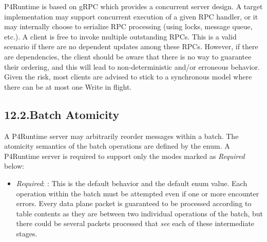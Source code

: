 \documentclass[11pt]{article}
\begin{document}
{%
P4Runtime is based on gRPC which provides a concurrent server design. A target
implementation may support concurrent execution of a given RPC handler, or it
may internally choose to serialize RPC processing (using locks, message queue,
etc.). A client is free to invoke multiple outstanding  RPCs. This is a
valid scenario if there are no dependent updates among these RPCs. However, if
there are dependencies, the client should be aware that there is no way to
guarantee their ordering, and this will lead to non-deterministic and/or
erroneous behavior. Given the risk, most clients are advised to stick to a
synchronous model where there can be at most one Write  in flight.%

\subsection{12.2.\hspace*{0.5em}Batch Atomicity}\label{sec-batch-atomicity}%

\noindent{}A P4Runtime server may arbitrarily reorder messages within a batch. The
atomicity semantics of the batch operations are defined by the 
enum. A P4Runtime server is required to support only the modes marked as
\emph{Required} below:%

\begin{itemize}%

\item{}
\emph{Required}: : This is the default behavior and the default
enum value. Each operation within the batch must be attempted even if one or
more encounter errors. Every data plane packet is guaranteed to be processed
according to table contents as they are between two individual operations of
the batch, but there could be several packets processed that \emph{see} each of
these intermediate stages.%


\end{itemize}}
\end{document}
